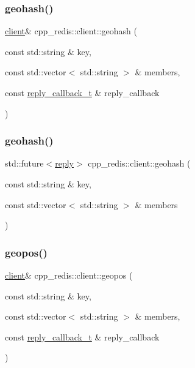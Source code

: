 \subsubsection{\texorpdfstring{geohash()}{geohash()}\hspace{0.1cm}{\footnotesize\ttfamily [1/2]}}
{\footnotesize\ttfamily \hyperlink{classcpp__redis_1_1client}{client}\& cpp\+\_\+redis\+::client\+::geohash (\begin{DoxyParamCaption}\item[{const std\+::string \&}]{key,  }\item[{const std\+::vector$<$ std\+::string $>$ \&}]{members,  }\item[{const \hyperlink{classcpp__redis_1_1client_a061a1140d36d2eaeda82b09a0bb3f9f2}{reply\+\_\+callback\+\_\+t} \&}]{reply\+\_\+callback }\end{DoxyParamCaption})}

\mbox{\label{classcpp__redis_1_1client_ac421d4e696a67c1295a6b55ceaeab680}} 
\subsubsection{\texorpdfstring{geohash()}{geohash()}\hspace{0.1cm}{\footnotesize\ttfamily [2/2]}}
{\footnotesize\ttfamily std\+::future$<$\hyperlink{classcpp__redis_1_1reply}{reply}$>$ cpp\+\_\+redis\+::client\+::geohash (\begin{DoxyParamCaption}\item[{const std\+::string \&}]{key,  }\item[{const std\+::vector$<$ std\+::string $>$ \&}]{members }\end{DoxyParamCaption})}

\mbox{\label{classcpp__redis_1_1client_ae4bba1470cf357a8c4d1f8360a9c8b79}} 
\subsubsection{\texorpdfstring{geopos()}{geopos()}\hspace{0.1cm}{\footnotesize\ttfamily [1/2]}}
{\footnotesize\ttfamily \hyperlink{classcpp__redis_1_1client}{client}\& cpp\+\_\+redis\+::client\+::geopos (\begin{DoxyParamCaption}\item[{const std\+::string \&}]{key,  }\item[{const std\+::vector$<$ std\+::string $>$ \&}]{members,  }\item[{const \hyperlink{classcpp__redis_1_1client_a061a1140d36d2eaeda82b09a0bb3f9f2}{reply\+\_\+callback\+\_\+t} \&}]{reply\+\_\+callback }\end{DoxyParamCaption})}

